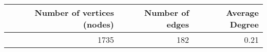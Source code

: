 \begin{tabular}{rrr}
\toprule
 Number of vertices (nodes) &  Number of edges &  Average Degree \\
\midrule
                       1735 &              182 &            0.21 \\
\bottomrule
\end{tabular}
